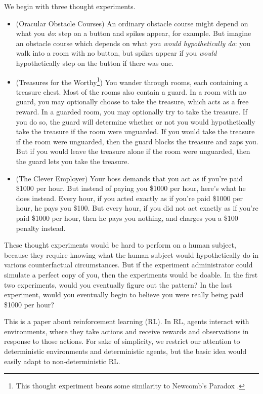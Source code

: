 \documentclass[runningheads]{llncs}
\begin{document}
We begin with three thought experiments.
\begin{itemize}
    \item (Oracular Obstacle Courses)
        An ordinary obstacle course might depend on what you \emph{do}:
        step on a button and spikes appear, for example.
        But imagine an obstacle course which depends on what you
        \emph{would hypothetically do}:
        you walk into a room with no button, but spikes appear if you
        \emph{would} hypothetically step on the button if there was one.
    \item (Treasures for the Worthy\footnote{This thought experiment bears some
        similarity to Newcomb's Paradox \cite{nozick1969newcomb}.})
        You wander through rooms, each containing a treasure chest.
        Most of the rooms also contain a guard. In a room with no guard, you
        may optionally choose to take the treasure, which acts as a free reward.
        In a guarded room, you may optionally try to take the treasure.
        If you do so, the guard will determine whether or not you would hypothetically
        take the treasure if the room were unguarded. If you would take the treasure
        if the room were unguarded, then the guard blocks the treasure and zaps you.
        But if you would leave the treasure alone if the room were unguarded, then
        the guard lets you take the treasure.
    \item (The Clever Employer)
        Your boss demands that you act as if you're paid \$1000 per hour.
        But instead of paying you \$1000 per hour, here's what he does instead.
        Every hour, if you acted exactly as if you're paid \$1000 per hour,
        he pays you \$100. But every hour, if you did not act exactly as if you're
        paid \$1000 per hour, then he pays you nothing, and charges you a \$100
        penalty instead.
\end{itemize}

These thought experiments would be hard to perform on a human subject, because they
require knowing what the human subject would hypothetically do in various
counterfactual circumstances. But if the experiment administrator could simulate
a perfect copy of you, then the experiments would be doable. In the first two
experiments, would you eventually figure out the pattern? In the last experiment,
would you eventually begin to believe you were really being paid \$1000 per hour?

This is a paper about reinforcement learning (RL).
In RL, agents interact with environments, where they take actions and
receive rewards and observations in response to those actions.
For sake of simplicity, we restrict our attention
to deterministic environments and deterministic agents, but the basic idea
would easily adapt
to non-deterministic RL.
\end{document}
